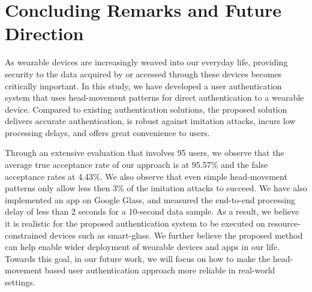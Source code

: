 \section{Concluding Remarks and Future Direction}
\label{sec:conc}
As wearable devices are increasingly weaved into our everyday life, providing security to the data acquired by or accessed through these devices becomes critically important. In this study, we have developed a user authentication system that uses head-movement patterns for direct
authentication to a wearable device. Compared to existing authentication solutions, the proposed solution delivers accurate authentication, is robust against imitation attacks, incurs low processing delays, and offers great convenience to users. 

Through an extensive evaluation that involves 95 users, we observe that the
average true acceptance rate of our approach is at 95.57$\%$ and the false
acceptance rates at 4.43$\%$. We also observe that even simple head-movement patterns only allow less then 3\% of the imitation attacks to succeed. We have also implemented an app on Google Glass, and measured the end-to-end processing delay of less than 2 seconds for a 10-second data sample. As a result, we believe it is realistic for the proposed authentication system to be executed on resource-constrained devices such as smart-glass. We further believe the proposed method can help enable wider deployment of wearable devices and apps in our life. Towards this goal, in our future work, we will focus on how to make the head-movement based user authentication approach more reliable in real-world settings.

